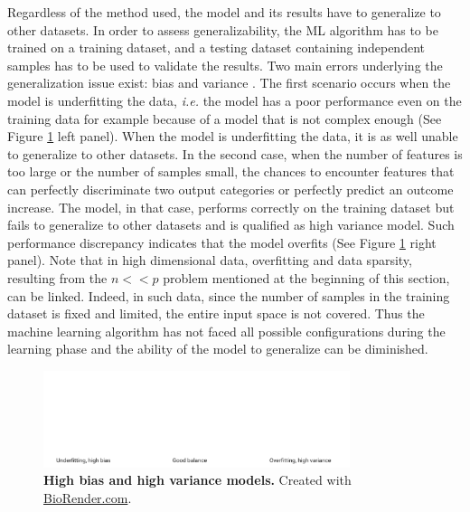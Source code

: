 Regardless of the method used, the model and its results have to generalize to other datasets. In order to assess generalizability, the \gls{ML} algorithm has to be trained on a training dataset, and a testing dataset containing independent samples has to be used to validate the results. Two main errors underlying the generalization issue exist: bias and variance \cite{Domingos2012}. The first scenario occurs when the model is underfitting the data, \textit{i.e.} the model has a poor performance even on the training data for example because of a model that is not complex enough (See Figure \ref{fig:intro_biasVSvariance} left panel). When the model is underfitting the data, it is as well unable to generalize to other datasets. In the second case, when the number of features is too large or the number of samples small, the chances to encounter features that can perfectly discriminate two output categories or perfectly predict an outcome increase. The model, in that case, performs correctly on the training dataset but fails to generalize to other datasets and is qualified as high variance model. Such performance discrepancy indicates that the model overfits (See Figure \ref{fig:intro_biasVSvariance} right panel). Note that in high dimensional data, overfitting and data sparsity, resulting from the $n<<p$ problem mentioned at the beginning of this section, can be linked. Indeed, in such data, since the number of samples in the training dataset is fixed and limited, the entire input space is not covered. Thus the machine learning algorithm has not faced all possible configurations during the learning phase and the ability of the model to generalize can be diminished. 
\begin{figure}[H]
    \centering
    \includegraphics[width=0.8\textwidth]{Figures/Intro/overfitting.pdf}
    \caption[High bias and high variance models]{\textbf{High bias and high variance models.} Created with \href{https://biorender.com/}{BioRender.com}. }
    \label{fig:intro_biasVSvariance}
\end{figure}

